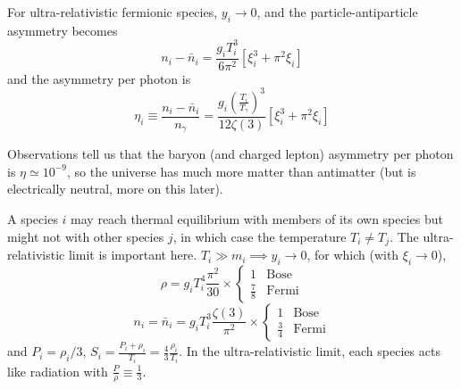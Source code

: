 \documentclass[a4paper,twoside,master.tex]{subfiles}
\begin{document}
For ultra-relativistic fermionic species, $ y_i \to 0 $, and the particle-antiparticle asymmetry becomes
\begin{equation}
    n_i - \bar{n}_i = \frac{g_i T_i^3}{6 \pi^2} \left[ \xi_i^3 + \pi^2 \xi_i \right]
\end{equation}
and the asymmetry per photon is
\begin{equation}
    \eta_i \equiv \frac{n_i - \bar{n}_i}{n_{\gamma}} = \frac{g_i \left( \frac{T_i}{T_{\gamma}} \right)^3}{12 \zeta(3)} \left[ \xi_i^3 + \pi^2 \xi_i \right]
\end{equation}

Observations tell us that the baryon (and charged lepton) asymmetry per photon is $ \eta \simeq 10^{-9} $, so the universe has much more matter than antimatter (but is electrically neutral, more on this later).

A species $ i $ may reach thermal equilibrium with members of its own species but might not with other species $ j $, in which case the temperature $ T_i \neq T_j $. The ultra-relativistic limit is important here. $ T_i \gg m_i \implies y_i \to 0 $, for which (with $ \xi_i \to 0 $),
\begin{equation}
    \rho = g_i T_i^4 \frac{\pi^2}{30} \times \begin{cases} 1 & \text{Bose} \\ \frac{7}{8} & \text{Fermi} \end{cases}
\end{equation}
\begin{equation}
    n_i = \bar{n}_i = g_i T_i^3 \frac{\zeta(3)}{\pi^2} \times \begin{cases} 1 & \text{Bose} \\ \frac{3}{4} & \text{Fermi} \end{cases}
\end{equation}
and $ P_i = \rho_i / 3 $, $ S_i = \frac{P_i + \rho_i}{T_i} = \frac{4}{3} \frac{\rho_i}{T_i} $. In the ultra-relativistic limit, each species acts like radiation with $ \frac{P}{\rho} \equiv \frac{1}{3} $.
\end{document}
